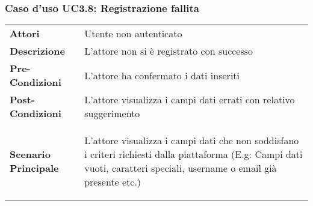 \subsubsection{Caso d'uso UC3.8:  Registrazione fallita}
\label{UC3_8}

\begin{longtable}{ l | p{11cm}}
	\hline
	\rowcolor{Gray}
	 \multicolumn{2}{c}{UC3.8 - Registrazione fallita} \\
	 \hline
	\textbf{Attori} & Utente non autenticato \\
	\textbf{Descrizione} & L'attore non si è registrato con successo  \\
	\textbf{Pre-Condizioni} & L'attore ha confermato i dati inseriti \\
	\textbf{Post-Condizioni} & L'attore visualizza i campi dati errati con relativo suggerimento \\
	\textbf{Scenario Principale} & \begin{enumerate*}[label=(\arabic*.),itemjoin={\newline}]
		\item L'attore visualizza i campi dati che non soddisfano i criteri richiesti dalla piattaforma (E.g: Campi dati vuoti, caratteri speciali, username o email già presente etc.)
	\end{enumerate*}\\
\end{longtable}